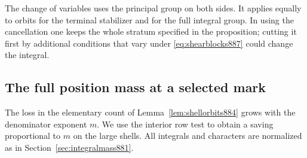 \documentclass[a4paper,11pt]{article}
\theoremstyle{definition}
\theoremstyle{remark}
\numberwithin{equation}{section}
\begin{document}
The change of variables uses the principal group on both sides.
It applies equally to orbits for the terminal stabilizer and for
the full integral group. In using the cancellation one keeps the
whole stratum specified in the proposition; cutting it first by
additional conditions that vary under \eqref{eq:shearblocks887}
could change the integral.
\clearpage

\subsection{The full position mass at a selected mark}
\label{sec:allfixermass888}

The loss in the elementary count of Lemma~\ref{lem:shellorbits884}
grows with the denominator exponent \(m\). We use the interior
row test to obtain a saving proportional to \(m\) on the large
shells. All integrals and characters are normalized as in
Section~\ref{sec:integralmass881}.
\end{document}
